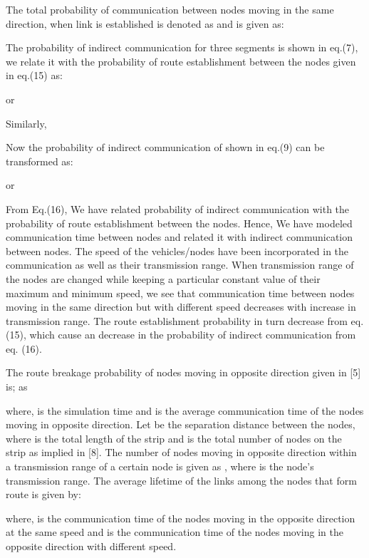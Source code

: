 \documentclass[journal]{IEEEtran}
\begin{document}
\tiny


\normalsize
The total probability of communication between nodes moving in the same direction, when link is established is denoted as  and is given as:


The probability of indirect communication for three segments is shown in eq.(7), we relate it with the probability of route establishment between the nodes given in eq.(15) as:

\tiny

\normalsize
or
\tiny

\normalsize
Similarly,




Now the probability of indirect communication of  shown  in eq.(9) can be transformed as:

or


From Eq.(16), We have related probability of indirect communication with the probability of route establishment between the nodes. Hence, We have modeled communication time between nodes and related it with indirect communication between nodes. The speed of the vehicles/nodes have been incorporated in the communication as well as their transmission range.  When transmission range of the nodes are changed while keeping a particular constant value of their maximum and minimum speed, we see that communication time between nodes moving in the same direction but with different speed decreases with increase in transmission range.  The route establishment probability in turn decrease from eq. (15), which cause an decrease in the probability of indirect communication from eq. (16).

The route breakage probability of nodes moving in opposite direction given in [5] is; as 


where,  is the simulation time and  is the average communication time of the nodes moving in opposite direction.
Let  be the separation distance between the nodes, where  is the total length of the strip and  is the total number of nodes on the strip as implied in [8]. The number of nodes moving in opposite direction within a transmission range of a certain node is given as , where  is the node's transmission range. The average lifetime of the links among the nodes that form route is given by:



where,  is the communication time of the nodes moving in the opposite direction at the same speed and  is the communication time of the nodes moving in the opposite direction with different speed.
\end{document}
